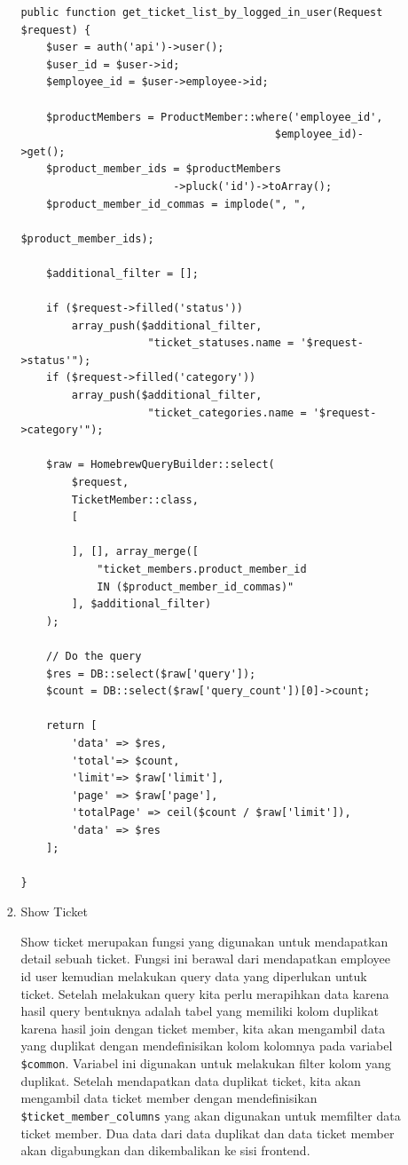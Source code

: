 \documentclass[12pt]{article}
\begin{document}
\begin{enumerate}[label=\textbf{5.\arabic*.}]
\begin{enumerate}[label=\textbf{5.1.\arabic*.}]
\begin{enumerate}[label=\arabic*.,wide, labelwidth=!, labelindent=0pt]
            \begin{lstlisting}
public function get_ticket_list_by_logged_in_user(Request 
$request) {
    $user = auth('api')->user();
    $user_id = $user->id;
    $employee_id = $user->employee->id;

    $productMembers = ProductMember::where('employee_id', 
                                        $employee_id)->get();
    $product_member_ids = $productMembers
                        ->pluck('id')->toArray();
    $product_member_id_commas = implode(", ", 
                                        $product_member_ids);

    $additional_filter = [];

    if ($request->filled('status'))
        array_push($additional_filter, 
                    "ticket_statuses.name = '$request->status'");
    if ($request->filled('category'))
        array_push($additional_filter, 
                    "ticket_categories.name = '$request->category'");

    $raw = HomebrewQueryBuilder::select(
        $request,
        TicketMember::class,
        [
            
        ], [], array_merge([
            "ticket_members.product_member_id 
            IN ($product_member_id_commas)"
        ], $additional_filter)
    );

    // Do the query
    $res = DB::select($raw['query']);
    $count = DB::select($raw['query_count'])[0]->count;

    return [
        'data' => $res,
        'total'=> $count,
        'limit'=> $raw['limit'],
        'page' => $raw['page'],
        'totalPage' => ceil($count / $raw['limit']),
        'data' => $res
    ];

}
            \end{lstlisting}

            \item Show Ticket
            
            Show ticket merupakan fungsi yang digunakan untuk mendapatkan detail sebuah ticket. Fungsi ini berawal dari mendapatkan employee id user kemudian melakukan query data yang diperlukan untuk ticket. Setelah melakukan query kita perlu merapihkan data karena hasil query bentuknya adalah tabel yang memiliki kolom duplikat karena hasil join dengan ticket member, kita akan mengambil data yang duplikat dengan mendefinisikan kolom kolomnya pada variabel \lstinline|$common|. Variabel ini digunakan untuk melakukan filter kolom yang duplikat. Setelah mendapatkan data duplikat ticket, kita akan mengambil data ticket member dengan mendefinisikan \lstinline|$ticket_member_columns| yang akan digunakan untuk memfilter data ticket member. Dua data dari data duplikat dan data ticket member akan digabungkan dan dikembalikan ke sisi frontend.
            

\end{enumerate}
\end{enumerate}
\end{enumerate}
\end{document}
